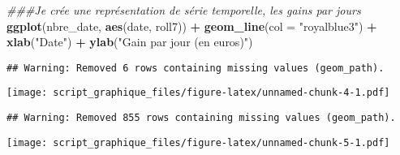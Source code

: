 \documentclass[
]{article}
\newenvironment{Shaded}{\begin{snugshade}}{\end{snugshade}}
\newcommand{\CommentTok}[1]{\textcolor[rgb]{0.56,0.35,0.01}{\textit{#1}}}
\newcommand{\DataTypeTok}[1]{\textcolor[rgb]{0.13,0.29,0.53}{#1}}
\newcommand{\KeywordTok}[1]{\textcolor[rgb]{0.13,0.29,0.53}{\textbf{#1}}}
\newcommand{\NormalTok}[1]{#1}
\newcommand{\OperatorTok}[1]{\textcolor[rgb]{0.81,0.36,0.00}{\textbf{#1}}}
\newcommand{\StringTok}[1]{\textcolor[rgb]{0.31,0.60,0.02}{#1}}
\begin{document}
\begin{Shaded}
\begin{Highlighting}[]
\CommentTok{###Je crée une représentation de série temporelle, les gains par jours}
\KeywordTok{ggplot}\NormalTok{(nbre_date, }\KeywordTok{aes}\NormalTok{(date, roll7)) }\OperatorTok{+}
\StringTok{  }\KeywordTok{geom_line}\NormalTok{(}\DataTypeTok{col =} \StringTok{"royalblue3"}\NormalTok{) }\OperatorTok{+}\StringTok{ }\KeywordTok{xlab}\NormalTok{(}\StringTok{"Date"}\NormalTok{) }\OperatorTok{+}\StringTok{ }
\StringTok{  }\KeywordTok{ylab}\NormalTok{(}\StringTok{"Gain par jour (en euros)"}\NormalTok{)}
\end{Highlighting}
\end{Shaded}

\begin{verbatim}
## Warning: Removed 6 rows containing missing values (geom_path).
\end{verbatim}

\texttt{[image: script\_graphique\_files/figure-latex/unnamed-chunk-4-1.pdf]}

\begin{Shaded}
\end{Shaded}

\begin{verbatim}
## Warning: Removed 855 rows containing missing values (geom_path).
\end{verbatim}

\texttt{[image: script\_graphique\_files/figure-latex/unnamed-chunk-5-1.pdf]}
\end{document}
